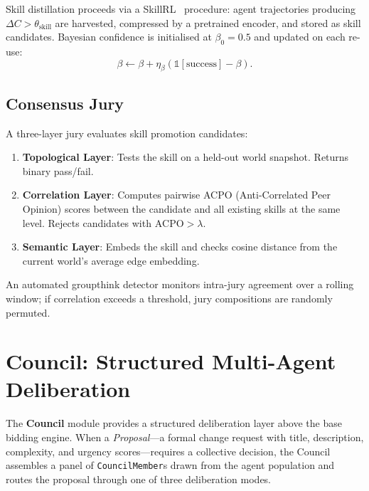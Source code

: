 \documentclass[11pt]{article}
\begin{document}
Skill distillation proceeds via a SkillRL~\cite{skillrl2023} procedure: agent
trajectories producing $\Delta C > \theta_{\text{skill}}$ are harvested, compressed
by a pretrained encoder, and stored as skill candidates. Bayesian confidence is
initialised at $\beta_0 = 0.5$ and updated on each re-use:
\begin{equation}
  \beta \leftarrow \beta + \eta_\beta (\mathbb{1}[\text{success}] - \beta).
  \label{eq:bayesian_conf}
\end{equation}

\subsection{Consensus Jury}

A three-layer jury evaluates skill promotion candidates:

\begin{enumerate}[noitemsep,topsep=4pt]
  \item \textbf{Topological Layer}: Tests the skill on a held-out world snapshot.
        Returns binary pass/fail.
  \item \textbf{Correlation Layer}: Computes pairwise ACPO (Anti-Correlated
        Peer Opinion) scores between the candidate and all existing skills at
        the same level. Rejects candidates with $\text{ACPO} > \lambda$.
  \item \textbf{Semantic Layer}: Embeds the skill and checks cosine distance
        from the current world's average edge embedding.
\end{enumerate}

An automated groupthink detector monitors intra-jury agreement over a rolling
window; if correlation exceeds a threshold, jury compositions are randomly
permuted.

\section{Council: Structured Multi-Agent Deliberation}
\label{sec:council}

The \textbf{Council} module provides a structured deliberation layer above the
base bidding engine. When a \emph{Proposal}---a formal change request with title,
description, complexity, and urgency scores---requires a collective decision,
the Council assembles a panel of \texttt{CouncilMember}s drawn from the agent
population and routes the proposal through one of three deliberation modes.
\end{document}
